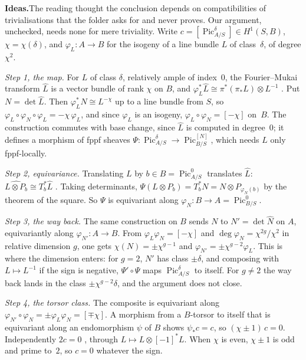 \documentclass[11pt]{article}
\newcommand{\Pic}{\operatorname{Pic}}
\theoremstyle{definition}
\theoremstyle{plain}\newtheorem*{proposition}{Proposition}\theoremstyle{definition}
\newcommand{\entry}[1]{\par\medskip\noindent\textbf{#1}\enspace}
\newcommand{\ideas}{\entry{Ideas.}}
\begin{document}
\ideas The reading thought the conclusion depends on compatibilities of trivialisations that the folder asks for and never proves. Our argument, unchecked, needs none for mere triviality. Write $c = [\Pic^\delta_{A/S}] \in H^1(S, B)$, $\chi = \chi(\delta)$, and $\varphi_L : A \to B$ for the isogeny of a line bundle $L$ of class~$\delta$, of degree $\chi^2$.

\emph{Step 1, the map.} For $L$ of class $\delta$, relatively ample of index~$0$, the Fourier--Mukai transform $\hat L$ is a vector bundle of rank $\chi$ on $B$, and $\varphi_L^*\hat L \cong \pi^*(\pi_*L) \otimes L^{-1}$ \cite[\S3]{mukai1981}. Put $N = \det \hat L$. Then $\varphi_L^*N \cong L^{-\chi}$ up to a line bundle from $S$, so $\varphi_L \circ \varphi_N \circ \varphi_L = -\chi\,\varphi_L$, and since $\varphi_L$ is an isogeny, $\varphi_L \circ \varphi_N = [-\chi]$ on~$B$. The construction commutes with base change, since $\hat L$ is computed in degree~$0$; it defines a morphism of fppf sheaves $\Psi : \Pic^\delta_{A/S} \to \Pic^{[N]}_{B/S}$, which needs $L$ only fppf-locally.

\emph{Step 2, equivariance.} Translating $L$ by $b \in B = \Pic^0_{A/S}$ translates $\hat L$: $\widehat{L \otimes P_b} \cong T_b^*\hat L$ \cite[\S3]{mukai1981}. Taking determinants, $\Psi(L \otimes P_b) = T_b^*N = N \otimes P_{\varphi_N(b)}$ by the theorem of the square. So $\Psi$ is equivariant along $\varphi_N : B \to A = \Pic^0_{B/S}$.

\emph{Step 3, the way back.} The same construction on $B$ sends $N$ to $N' = \det \hat N$ on $A$, equivariantly along $\varphi_{N'} : A \to B$. From $\varphi_L \varphi_N = [-\chi]$ and $\deg \varphi_N = \chi^{2g}/\chi^2$ in relative dimension $g$, one gets $\chi(N) = \pm\chi^{g-1}$ and $\varphi_{N'} = \pm\chi^{g-2}\varphi_L$. This is where the dimension enters: for $g = 2$, $N'$ has class $\pm\delta$, and composing with $L \mapsto L^{-1}$ if the sign is negative, $\Psi' \circ \Psi$ maps $\Pic^\delta_{A/S}$ to itself. For $g \ne 2$ the way back lands in the class $\pm\chi^{g-2}\delta$, and the argument does not close.

\emph{Step 4, the torsor class.} The composite is equivariant along $\varphi_{N'} \circ \varphi_N = \pm\varphi_L\varphi_N = [\mp\chi]$. A morphism from a $B$-torsor to itself that is equivariant along an endomorphism $\psi$ of $B$ shows $\psi_*c = c$, so $(\chi \pm 1)\,c = 0$. Independently $2c = 0$ \cite[\S4]{poonenstoll}, through $L \mapsto L \otimes [-1]^*L$. When $\chi$ is even, $\chi \pm 1$ is odd and prime to~$2$, so $c = 0$ whatever the sign.
\end{document}
